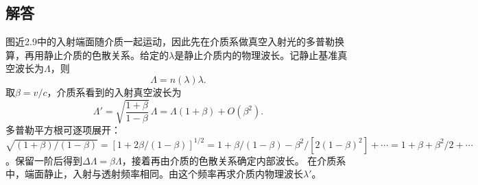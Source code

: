 \documentclass[UTF8,fontset=fandol,a4paper,11pt]{ctexart}
\begin{document}
\subsection*{解答}


图近2.9中的入射端面随介质一起运动，因此先在介质系做真空入射光的多普勒换算，再用静止介质的色散关系。给定的$\lambda$是静止介质内的物理波长。记静止基准真空波长为$\Lambda$，则
\[
\Lambda=n(\lambda)\lambda.
\]
取$\beta=v/c$，介质系看到的入射真空波长为
\[
\Lambda'=\sqrt{\frac{1+\beta}{1-\beta}}\,\Lambda
=\Lambda(1+\beta)+O(\beta^2).
\]
多普勒平方根可逐项展开：$\sqrt{(1+\beta)/(1-\beta)}=[1+2\beta/(1-\beta)]^{1/2}=1+\beta/(1-\beta)-\beta^2/[2(1-\beta)^2]+\cdots=1+\beta+\beta^2/2+\cdots$。保留一阶后得到$\Delta\Lambda=\beta\Lambda$，接着再由介质的色散关系确定内部波长。
在介质系中，端面静止，入射与透射频率相同。由这个频率再求介质内物理波长$\lambda'$。
\end{document}
